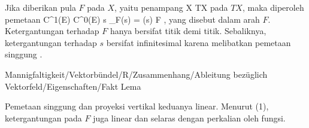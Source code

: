 Jika diberikan pula
$F$ pada $X$, yaitu penampang
 { X } { TX
} {}
pada
$TX$, maka diperoleh pemetaan
 {C^1(E)} {C^0(E)
} {s } {\nabla_F(s) = \nabla (s) \circ F
} {,}
yang disebut  {} dalam arah $F$. Ketergantungan terhadap $F$ hanya bersifat titik demi titik. Sebaliknya, ketergantungan terhadap $s$ bersifat infinitesimal karena melibatkan pemetaan singgung
.



{Mannigfaltigkeit/Vektorbündel/R/Zusammenhang/Ableitung bezüglich Vektorfeld/Eigenschaften/Fakt}
{Lema}
{}
{

\faktzusatz {}
\faktzusatz {}

}
{

 {Pemetaan singgung dan proyeksi vertikal keduanya linear. Menurut (1), ketergantungan pada $F$ juga linear dan selaras dengan perkalian oleh fungsi.
}

}



